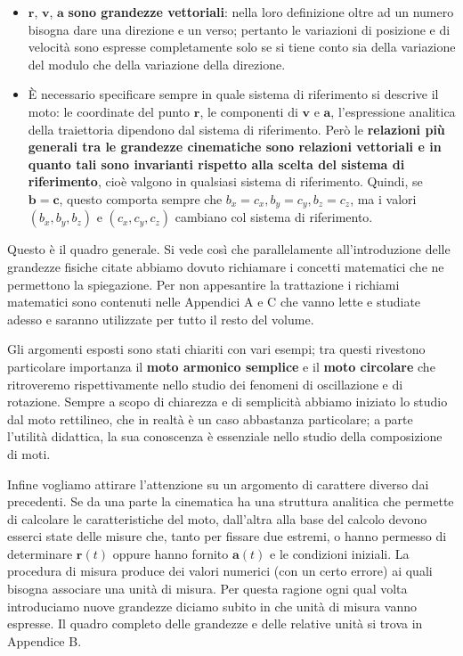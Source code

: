 \documentclass[12pt]{article}
\begin{document}
\begin{itemize}
    \item $\mathbf{r}$, $\mathbf{v}$, $\mathbf{a}$ \textbf{sono grandezze vettoriali}: nella loro definizione oltre ad un numero bisogna dare una direzione e un verso; pertanto le variazioni di posizione e di velocità sono espresse completamente solo se si tiene conto sia della variazione del modulo che della variazione della direzione.
    
    \item È necessario specificare sempre in quale sistema di riferimento si descrive il moto: le coordinate del punto $\mathbf{r}$, le componenti di $\mathbf{v}$ e $\mathbf{a}$, l'espressione analitica della traiettoria dipendono dal sistema di riferimento. Però le \textbf{relazioni più generali tra le grandezze cinematiche sono relazioni vettoriali e in quanto tali sono invarianti rispetto alla scelta del sistema di riferimento}, cioè valgono in qualsiasi sistema di riferimento. Quindi, se $\mathbf{b} = \mathbf{c}$, questo comporta sempre che $b_x = c_x, b_y = c_y, b_z = c_z$, ma i valori $(b_x, b_y, b_z)$ e $(c_x, c_y, c_z)$ cambiano col sistema di riferimento.
\end{itemize}

Questo è il quadro generale. Si vede così che parallelamente all'introduzione delle grandezze fisiche citate abbiamo dovuto richiamare i concetti matematici che ne permettono la spiegazione. Per non appesantire la trattazione i richiami matematici sono contenuti nelle Appendici A e C che vanno lette e studiate adesso e saranno utilizzate per tutto il resto del volume.

Gli argomenti esposti sono stati chiariti con vari esempi; tra questi rivestono particolare importanza il \textbf{moto armonico semplice} e il \textbf{moto circolare} che ritroveremo rispettivamente nello studio dei fenomeni di oscillazione e di rotazione. Sempre a scopo di chiarezza e di semplicità abbiamo iniziato lo studio dal moto rettilineo, che in realtà è un caso abbastanza particolare; a parte l'utilità didattica, la sua conoscenza è essenziale nello studio della composizione di moti.

Infine vogliamo attirare l'attenzione su un argomento di carattere diverso dai precedenti. Se da una parte la cinematica ha una struttura analitica che permette di calcolare le caratteristiche del moto, dall'altra alla base del calcolo devono esserci state delle misure che, tanto per fissare due estremi, o hanno permesso di determinare $\mathbf{r}(t)$ oppure hanno fornito $\mathbf{a}(t)$ e le condizioni iniziali. La procedura di misura produce dei valori numerici (con un certo errore) ai quali bisogna associare una unità di misura. Per questa ragione ogni qual volta introduciamo nuove grandezze diciamo subito in che unità di misura vanno espresse. Il quadro completo delle grandezze e delle relative unità si trova in Appendice B.
\end{document}
